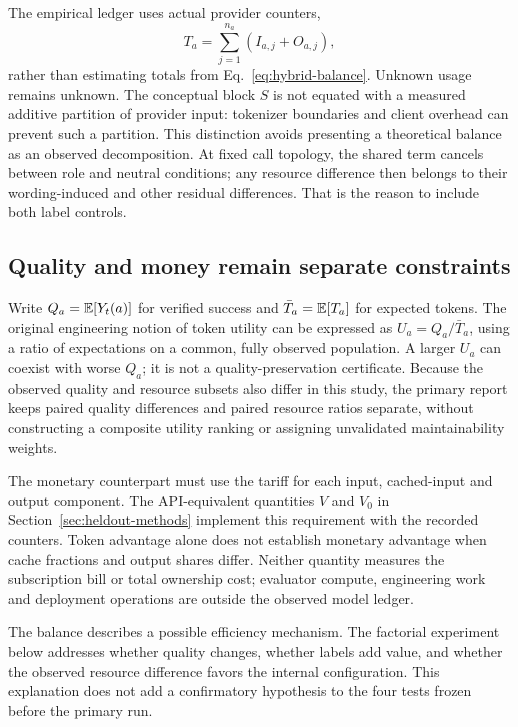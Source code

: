 The empirical ledger uses actual provider counters,
\begin{equation}
T_a=\sum_{j=1}^{n_a}(I_{a,j}+O_{a,j}),
\label{eq:hybrid-observed-ledger}
\end{equation}
rather than estimating totals from Eq.~\eqref{eq:hybrid-balance}. Unknown usage remains unknown. The conceptual block $S$ is not equated with a measured additive partition of provider input: tokenizer boundaries and client overhead can prevent such a partition. This distinction avoids presenting a theoretical balance as an observed decomposition. At fixed call topology, the shared term cancels between role and neutral conditions; any resource difference then belongs to their wording-induced and other residual differences. That is the reason to include both label controls.

\subsection{Quality and money remain separate constraints}
Write $Q_a=\mathbb{E}[Y_t(a)]$ for verified success and $\bar T_a=\mathbb{E}[T_a]$ for expected tokens. The original engineering notion of token utility can be expressed as $U_a=Q_a/\bar T_a$, using a ratio of expectations on a common, fully observed population. A larger $U_a$ can coexist with worse $Q_a$; it is not a quality-preservation certificate. Because the observed quality and resource subsets also differ in this study, the primary report keeps paired quality differences and paired resource ratios separate, without constructing a composite utility ranking or assigning unvalidated maintainability weights.

The monetary counterpart must use the tariff for each input, cached-input and output component. The API-equivalent quantities $V$ and $V_0$ in Section~\ref{sec:heldout-methods} implement this requirement with the recorded counters. Token advantage alone does not establish monetary advantage when cache fractions and output shares differ. Neither quantity measures the subscription bill or total ownership cost; evaluator compute, engineering work and deployment operations are outside the observed model ledger.

The balance describes a possible efficiency mechanism. The factorial experiment below addresses whether quality changes, whether labels add value, and whether the observed resource difference favors the internal configuration. This explanation does not add a confirmatory hypothesis to the four tests frozen before the primary run.
